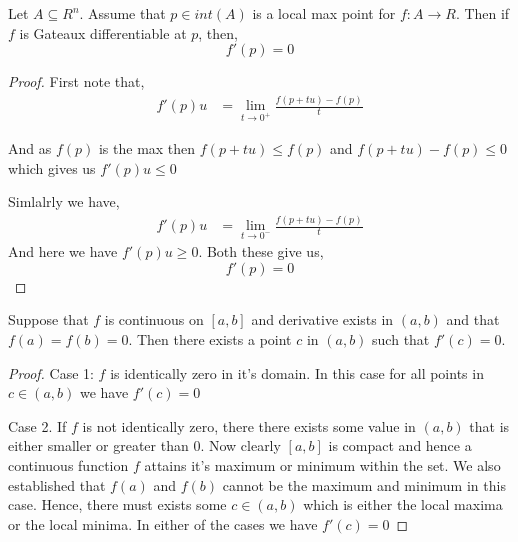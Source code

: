 \begin{theorem}
    Let $A \subseteq R^{n}$. Assume that $p \in int(A)$ is a local max point for $f:A \to R$. Then if $f$ is Gateaux differentiable at $p$, then, 
    \[
        f'(p) = 0
    \] 
\end{theorem}
\begin{proof}
    First note that,
    \begin{align*}
        f'(p) u &= \lim_{t \to 0^{+}} \frac{f(p + tu) - f(p)}{t}
    \end{align*}

    And as $f(p)$ is the max then $f(p + tu) \le f(p)$ and $f(p + tu) - f(p) \le 0$ which gives us $f'(p) u \le 0$

    Simlalrly we have, 
    \begin{align*}
        f'(p) u &= \lim_{t \to 0^{-}} \frac{f(p + tu) - f(p)}{t}
    \end{align*}
    And here we have $f'(p) u\ge 0$. Both these give us, 
    \[
        f'(p) = 0
    \]
\end{proof}
\begin{theorem}
    Suppose that $f$ is continuous on $[a, b]$ and derivative exists in $(a, b)$ and that $f(a) = f(b) = 0$. Then there exists a point $c$ in $(a, b)$ such that $f'(c) = 0$.
\end{theorem}
\begin{proof}
    
   Case 1: $f$ is identically zero  in it's domain. In this case for all points in $c \in (a, b)$ we have $f'(c) = 0$

   \vspace{1em}
   
   Case 2. If $f$ is not identically zero, there there exists some value in $(a, b)$ that is either smaller or greater than $0$. Now clearly $[a, b]$ is compact and hence a continuous function $f$ attains it's maximum or minimum within the set. We also established that $f(a)$ and $f(b)$ cannot be the maximum and minimum in this case. Hence, there must exists some $c \in (a, b)$ which is either the local maxima or the local minima. In either of the cases we have $f'(c) = 0$
\end{proof}



